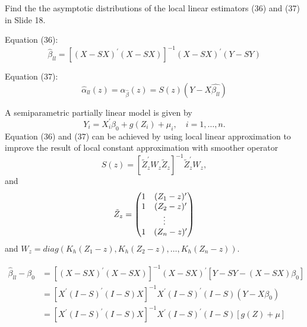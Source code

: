 \begin{problem}[18.1]
    Find the the asymptotic distributions of the local linear estimators (36) and (37) in Slide 18.
\end{problem}

\begin{solution}
    Equation (36):
    \begin{equation}
        \hat{\beta}_{l l} = \left[(X-S X)^{\prime}(X-S X)\right]^{-1}(X-S X)^{\prime}(Y-S Y)
    \end{equation}

    Equation (37):
    \begin{equation}
        \hat{\alpha}_{l l} (z) = \alpha_{\hat{\beta}}(z) = S(z) (Y- X\hat{\beta_{ll}})
    \end{equation}

    A semiparametric partially linear model is given by
    \begin{equation*}
        Y_i = X_i^\prime \beta_0 + g(Z_i) + \mu_i,\quad i=1,\dots,n.
    \end{equation*}
    Equation (36) and (37) can be achieved by using local linear approximation to improve the result of local constant approximation with smoother operator
    \begin{equation*}
        S(z) = \left[ \tilde{Z}_z^\prime W_z \tilde{Z}_z \right]^{-1} \tilde{Z}_z^\prime W_z,
    \end{equation*}
    and
    \begin{equation*}
        \tilde{Z}_z = \left(
            \begin{matrix}
                1 & (Z_1 -z)^\prime \\
                1 & (Z_2 -z)^\prime \\
                \multicolumn{2}{c}{$\vdots$}     \\
                1 & (Z_n -z)^\prime \\
            \end{matrix}
        \right)
    \end{equation*}
    and $W_z = diag \left(K_h (Z_1 - z), K_h (Z_2 - z),\dots, K_h (Z_n - z) \right)$.

    \begin{equation*}
        \begin{split}
            \hat{\beta}_{l l} - \beta_0 
            & = \left[(X-S X)^{\prime}(X-S X)\right]^{-1} (X-S X)^{\prime} [ Y - S Y - (X - S X)\beta_0] \\
            & = \left[ X^\prime (I-S)^\prime (I-S) X \right]^{-1} X^\prime (I-S)^\prime (I-S) ( Y - X\beta_0) \\ 
            & = \left[ X^\prime (I-S)^\prime (I-S) X \right]^{-1} X^\prime (I-S)^\prime (I-S) \left[g(Z) + \mu\right]
        \end{split}
    \end{equation*}


\end{solution}
